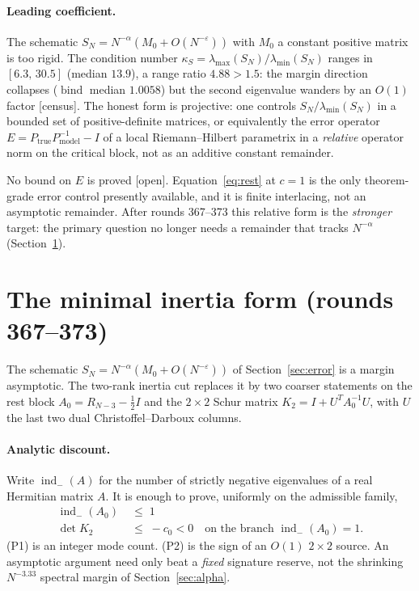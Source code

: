 \documentclass[11pt]{article}
\theoremstyle{remark}
\newcommand{\half}{\tfrac12}
\newcommand{\gr}[1]{\textnormal{\small[#1]}}
\begin{document}
\paragraph{Leading coefficient.}
The schematic
$S_{N}=N^{-\alpha}(M_{0}+O(N^{-\varepsilon}))$
with $M_{0}$ a constant positive matrix is too rigid.  The condition
number $\kappa_{S}=\lambda_{\max}(S_{N})/\lambda_{\min}(S_{N})$
ranges in $[6.3,\,30.5]$ (median $13.9$), a range ratio $4.88>1.5$:
the margin direction collapses ($\operatorname{bind}$ median
$1.0058$) but the second eigenvalue wanders by an $O(1)$ factor
\gr{census}.  The honest form is projective: one controls
$S_{N}/\lambda_{\min}(S_{N})$ in a bounded set of positive-definite
matrices, or equivalently the error operator
$E=P_{\mathrm{true}}P_{\mathrm{model}}^{-1}-I$
of a local Riemann--Hilbert parametrix in a \emph{relative} operator
norm on the critical block, not as an additive constant remainder.

No bound on $E$ is proved \gr{open}.  Equation~\eqref{eq:rest} at
$c=1$ is the only theorem-grade error control presently available,
and it is finite interlacing, not an asymptotic remainder.  After
rounds 367--373 this relative form is the \emph{stronger} target:
the primary question no longer needs a remainder that tracks
$N^{-\alpha}$ (Section~\ref{sec:minimal}).

\section{The minimal inertia form (rounds 367--373)}
\label{sec:minimal}

The schematic $S_{N}=N^{-\alpha}(M_{0}+O(N^{-\varepsilon}))$ of
Section~\ref{sec:error} is a margin asymptotic.  The two-rank
inertia cut replaces it by two coarser statements on the rest block
$A_{0}=R_{N-3}-\half I$ and the $2\times2$ Schur matrix
$K_{2}=I+U^{T}A_{0}^{-1}U$, with $U$ the last two dual
Christoffel--Darboux columns.

\paragraph{Analytic discount.}
Write $\operatorname{ind}_{-}(A)$ for the number of strictly
negative eigenvalues of a real Hermitian matrix $A$.  It is enough
to prove, uniformly on the admissible family,
\begin{align}
\operatorname{ind}_{-}(A_{0})
&\;\le\;1
\tag{P1}\\
\det K_{2}
&\;\le\;-c_{0}<0
\quad\text{on the branch }\operatorname{ind}_{-}(A_{0})=1.
\tag{P2}
\end{align}
(P1) is an integer mode count.  (P2) is the sign of an $O(1)$
$2\times2$ source.  An asymptotic argument need only beat a
\emph{fixed} signature reserve, not the shrinking
$N^{-3.33}$ spectral margin of Section~\ref{sec:alpha}.
\end{document}
